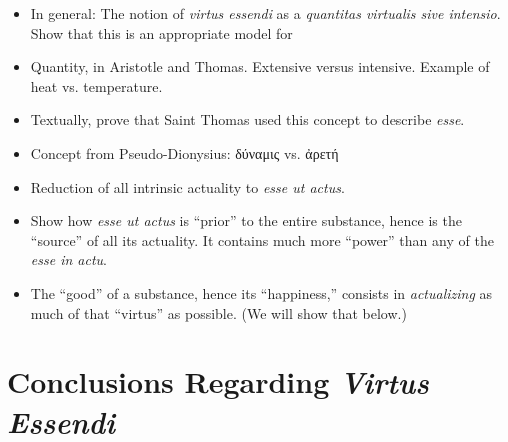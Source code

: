 \begin{DONE}
  \begin{itemize}
    \item In general: The notion of \emph{virtus essendi} as a
          \emph{quantitas virtualis sive intensio}. Show that this is an
          appropriate model for 
    
    \item Quantity, in Aristotle and Thomas. Extensive versus intensive.
          Example of heat vs. temperature.

	\item Textually, prove that Saint Thomas used this concept to describe \emph{esse}.

	\item Concept from Pseudo-Dionysius: δύναμις vs. ἀρετή

    \item Reduction of all intrinsic actuality to \emph{esse ut actus}.

    \item Show how \emph{esse ut actus} is \enquote{prior} to the entire substance, hence is the \enquote{source} of all its actuality. It contains much more \enquote{power} than any of the \emph{esse in actu}.

    \item The \enquote{good} of a substance, hence its \enquote{happiness,} consists in \emph{actualizing} as much of that \enquote{virtus} as possible. (We will show that below.)

  \end{itemize}
\end{DONE}


\section{Conclusions Regarding \emph{Virtus Essendi}}

